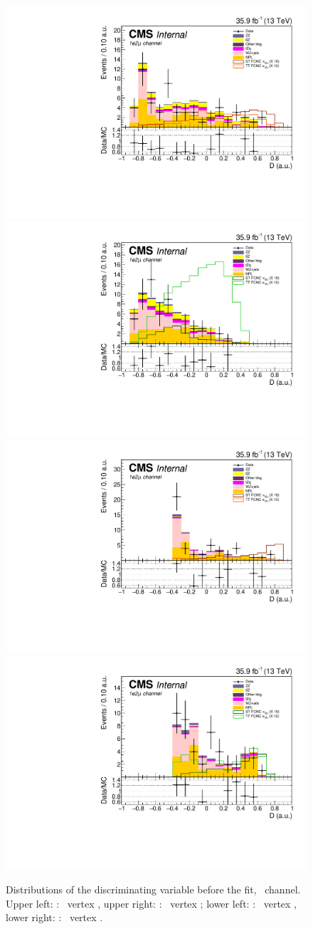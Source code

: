 \begin{figure}[ht]
	\centering
	\includegraphics[width=0.39\linewidth]{6_Search/Figures/BDTdistributions/toppair_Zut_BDT_uue_Stack}
	\includegraphics[width=0.39\linewidth]{6_Search/Figures/BDTdistributions/toppair_Zct_BDT_uue_Stack}
	\includegraphics[width=0.39\linewidth]{6_Search/Figures/BDTdistributions/singletop_Zut_BDT_uue_Stack}
	\includegraphics[width=0.39\linewidth]{6_Search/Figures/BDTdistributions/singletop_Zct_BDT_uue_Stack}
	\caption{Distributions of the discriminating variable before the fit, \emumu\  channel. Upper left: \TTSR: \Zut\ vertex , upper right: \TTSR: \Zct\ vertex ; lower left: \STSR: \Zut\ vertex , lower right: \STSR: \Zct\ vertex .}
	\label{fig:bdtuuestack}
\end{figure}

